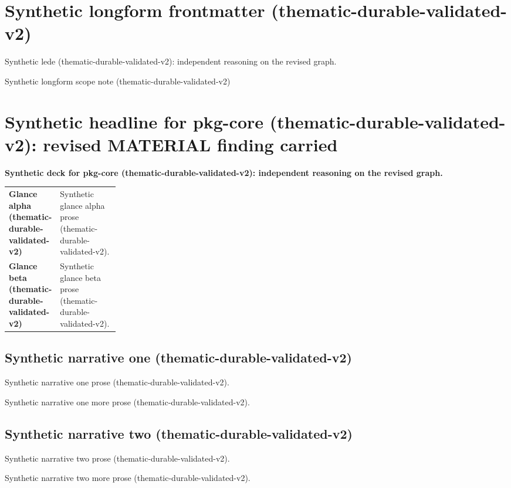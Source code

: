 \documentclass[lualatex,a4paper,10pt]{jlreq}
\begin{document}
\surveycover
\clearpage
\section*{Synthetic longform frontmatter (thematic-durable-validated-v2)}
Synthetic lede (thematic-durable-validated-v2): independent reasoning on the revised graph.

\begin{claimboundary}
\noindent Synthetic longform scope note (thematic-durable-validated-v2)\par
\end{claimboundary}
\medskip
\tableofcontents
\clearpage
\Needspace{0.24\textheight}
\section{Synthetic headline for pkg-core (thematic-durable-validated-v2): revised MATERIAL finding carried}
\label{pkg:pkg-core}
\noindent\textbf{Synthetic deck for pkg-core (thematic-durable-validated-v2): independent reasoning on the revised graph.} \cite{sp001lnd001}\par\medskip
\begin{themeoverview}
\begin{tabularx}{\linewidth}{@{}>{\bfseries}p{0.22\linewidth}X@{}}
Glance alpha (thematic-durable-validated-v2) & Synthetic glance alpha prose (thematic-durable-validated-v2). \cite{sp001lnd001} \\
Glance beta (thematic-durable-validated-v2) & Synthetic glance beta prose (thematic-durable-validated-v2). \cite{sp001lnd001} \\
\end{tabularx}
\end{themeoverview}
\medskip
\begin{multicols}{2}
\subsection*{Synthetic narrative one (thematic-durable-validated-v2)}
\noindent Synthetic narrative one prose (thematic-durable-validated-v2). \cite{sp001lnd001}\par\medskip
\noindent Synthetic narrative one more prose (thematic-durable-validated-v2). \cite{sp001lnd001}\par\medskip
\subsection*{Synthetic narrative two (thematic-durable-validated-v2)}
\noindent Synthetic narrative two prose (thematic-durable-validated-v2). \cite{sp001lnd001}\par\medskip
\noindent Synthetic narrative two more prose (thematic-durable-validated-v2). \cite{sp001lnd001}\par\medskip
\end{multicols}
\end{document}
